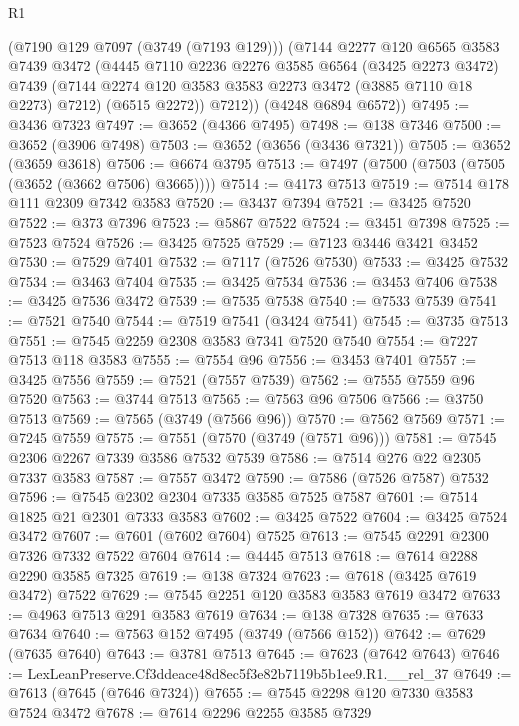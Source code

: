 \begin{lexlean}{R1}
\begin{coremodule}
        (@7190 @129 @7097 (@3749 (@7193 @129)))
        (@7144
          @2277
          @120
          @6565
          @3583
          @7439
          @3472
          (@4445
            @7110
            @2236
            @2276
            @3585
            @6564
            (@3425 @2273 @3472)
            @7439
            (@7144 @2274 @120 @3583 @3583 @2273 @3472 (@3885 @7110 @18 @2273) @7212)
            (@6515 @2272))
          @7212))
      (@4248 @6894 @6572))
@7495 := @3436 @7323
@7497 := @3652 (@4366 @7495)
@7498 := @138 @7346
@7500 := @3652 (@3906 @7498)
@7503 := @3652 (@3656 (@3436 @7321))
@7505 := @3652 (@3659 @3618)
@7506 := @6674 @3795
@7513 := @7497 (@7500 (@7503 (@7505 (@3652 (@3662 @7506) @3665))))
@7514 := @4173 @7513
@7519 := @7514 @178 @111 @2309 @7342 @3583
@7520 := @3437 @7394
@7521 := @3425 @7520
@7522 := @373 @7396
@7523 := @5867 @7522
@7524 := @3451 @7398
@7525 := @7523 @7524
@7526 := @3425 @7525
@7529 := @7123 @3446 @3421 @3452
@7530 := @7529 @7401
@7532 := @7117 (@7526 @7530)
@7533 := @3425 @7532
@7534 := @3463 @7404
@7535 := @3425 @7534
@7536 := @3453 @7406
@7538 := @3425 @7536 @3472
@7539 := @7535 @7538
@7540 := @7533 @7539
@7541 := @7521 @7540
@7544 := @7519 @7541 (@3424 @7541)
@7545 := @3735 @7513
@7551 := @7545 @2259 @2308 @3583 @7341 @7520 @7540
@7554 := @7227 @7513 @118 @3583
@7555 := @7554 @96
@7556 := @3453 @7401
@7557 := @3425 @7556
@7559 := @7521 (@7557 @7539)
@7562 := @7555 @7559 @96 @7520
@7563 := @3744 @7513
@7565 := @7563 @96 @7506
@7566 := @3750 @7513
@7569 := @7565 (@3749 (@7566 @96))
@7570 := @7562 @7569
@7571 := @7245 @7559
@7575 := @7551 (@7570 (@3749 (@7571 @96)))
@7581 := @7545 @2306 @2267 @7339 @3586 @7532 @7539
@7586 := @7514 @276 @22 @2305 @7337 @3583
@7587 := @7557 @3472
@7590 := @7586 (@7526 @7587) @7532
@7596 := @7545 @2302 @2304 @7335 @3585 @7525 @7587
@7601 := @7514 @1825 @21 @2301 @7333 @3583
@7602 := @3425 @7522
@7604 := @3425 @7524 @3472
@7607 := @7601 (@7602 @7604) @7525
@7613 := @7545 @2291 @2300 @7326 @7332 @7522 @7604
@7614 := @4445 @7513
@7618 := @7614 @2288 @2290 @3585 @7325
@7619 := @138 @7324
@7623 := @7618 (@3425 @7619 @3472) @7522
@7629 := @7545 @2251 @120 @3583 @3583 @7619 @3472
@7633 := @4963 @7513 @291 @3583 @7619
@7634 := @138 @7328
@7635 := @7633 @7634
@7640 := @7563 @152 @7495 (@3749 (@7566 @152))
@7642 := @7629 (@7635 @7640)
@7643 := @3781 @7513
@7645 := @7623 (@7642 @7643)
@7646 := LexLeanPreserve.Cf3ddeace48d8ec5f3e82b7119b5b1ee9.R1.__rel_37
@7649 := @7613 (@7645 (@7646 @7324))
@7655 := @7545 @2298 @120 @7330 @3583 @7524 @3472
@7678 := @7614
    @2296
    @2255
    @3585
    @7329

\end{coremodule}
\end{lexlean}
